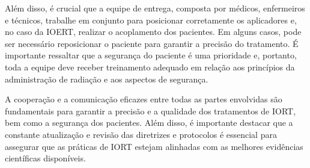 \documentclass[11pt,a4paper]{article}
\begin{document}
	Além disso, é crucial que a equipe de entrega, composta por médicos, enfermeiros e técnicos, trabalhe em conjunto para posicionar corretamente os aplicadores e, no caso da IOERT, realizar o acoplamento dos pacientes. Em alguns casos, pode ser necessário reposicionar o paciente para garantir a precisão do tratamento. É importante ressaltar que a segurança do paciente é uma prioridade e, portanto, toda a equipe deve receber treinamento adequado em relação aos princípios da administração de radiação e aos aspectos de segurança.

	A cooperação e a comunicação eficazes entre todas as partes envolvidas são fundamentais para garantir a precisão e a qualidade dos tratamentos de IORT, bem como a segurança dos pacientes. Além disso, é importante destacar que a constante atualização e revisão das diretrizes e protocolos é essencial para assegurar que as práticas de IORT estejam alinhadas com as melhores evidências científicas disponíveis.


\end{document}
